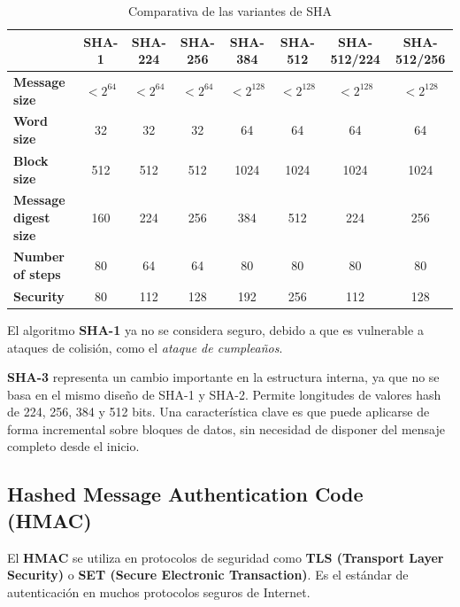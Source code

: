 \documentclass[11pt,a4paper]{article}
\begin{document}
\begin{table}[h!]
\centering
\renewcommand{\arraystretch}{1.2}
\setlength{\tabcolsep}{8pt}
\begin{tabular}{|l|c|c|c|c|c|c|c|}
\hline
 & \textbf{SHA-1} & \textbf{SHA-224} & \textbf{SHA-256} & \textbf{SHA-384} & \textbf{SHA-512} & \textbf{SHA-512/224} & \textbf{SHA-512/256} \\ \hline
\textbf{Message size} & $< 2^{64}$ & $< 2^{64}$ & $< 2^{64}$ & $< 2^{128}$ & $< 2^{128}$ & $< 2^{128}$ & $< 2^{128}$ \\ \hline
\textbf{Word size} & 32 & 32 & 32 & 64 & 64 & 64 & 64 \\ \hline
\textbf{Block size} & 512 & 512 & 512 & 1024 & 1024 & 1024 & 1024 \\ \hline
\textbf{Message digest size} & 160 & 224 & 256 & 384 & 512 & 224 & 256 \\ \hline
\textbf{Number of steps} & 80 & 64 & 64 & 80 & 80 & 80 & 80 \\ \hline
\textbf{Security} & 80 & 112 & 128 & 192 & 256 & 112 & 128 \\ \hline
\end{tabular}
\caption{Comparativa de las variantes de SHA}
\end{table}


\begin{NotaBox}
El algoritmo \textbf{SHA-1} ya no se considera seguro, debido a que es vulnerable a ataques de colisión, como el \textit{ataque de cumpleaños}.
\end{NotaBox}

\begin{DefBox}
\textbf{SHA-3} representa un cambio importante en la estructura interna, ya que no se basa en el mismo diseño de SHA-1 y SHA-2.
Permite longitudes de valores hash de 224, 256, 384 y 512 bits.
Una característica clave es que puede aplicarse de forma incremental sobre bloques de datos, sin necesidad de disponer del mensaje completo desde el inicio.
\end{DefBox}

\subsection{Hashed Message Authentication Code (HMAC)}

El \textbf{HMAC} se utiliza en protocolos de seguridad como \textbf{TLS (Transport Layer Security)} o \textbf{SET (Secure Electronic Transaction)}.
Es el estándar de autenticación en muchos protocolos seguros de Internet.
\end{document}
